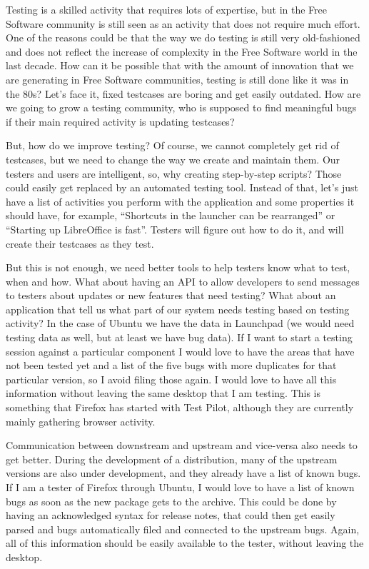 Testing is a skilled activity that requires lots of expertise, but in the Free Software
community is still seen as an activity that does not require much effort. One of
the reasons could be that the way we do testing is still very old-fashioned and
does not reflect the increase of complexity in the Free Software world in the
last decade. How can it be possible that with the amount of innovation that we
are generating in Free Software communities, testing is still done like it was in
the 80s? Let's face it, fixed testcases are boring and get easily outdated. How
are we going to grow a testing community, who is supposed to find meaningful
bugs if their main required activity is updating testcases?

But, how do we improve testing? Of course, we cannot completely get rid of
testcases, but we need to change the way we create and maintain them. Our
testers and users are intelligent, so, why creating step-by-step scripts? Those
could easily get replaced by an automated testing tool. Instead of that, let's
just have a list of activities you perform with the application and some
properties it should have, for example, ``Shortcuts in the launcher can be
rearranged'' or ``Starting up LibreOffice is fast''. Testers will figure out how
to do it, and will create their testcases as they test.

But this is not enough, we need better tools to help testers know what to test,
when and how.  What about having an API to allow developers to send messages to
testers about updates or new features that need testing? What about an
application that tell us what part of our system needs testing based on testing
activity? In the case of Ubuntu we have the data in Launchpad (we would need
testing data as well, but at least we have bug data). If I want to start a
testing session against a particular component I would love to have the areas
that have not been tested yet and a list of the five bugs with more duplicates
for that particular version, so I avoid filing those again. I would love to have
all this information without leaving the same desktop that I am testing. This is
something that Firefox has started with Test Pilot, although they are currently
mainly gathering browser activity.

Communication between downstream and upstream and vice-versa also needs to get
better. During the development of a distribution, many of the upstream versions
are also under development, and they already have a list of known bugs. If I am
a tester of Firefox through Ubuntu, I would love to have a list of known bugs as
soon as the new package gets to the archive. This could be done by having an
acknowledged syntax for release notes, that could then get easily parsed and
bugs automatically filed and connected to the upstream bugs. Again, all of this
information should be easily available to the tester, without leaving the
desktop.

